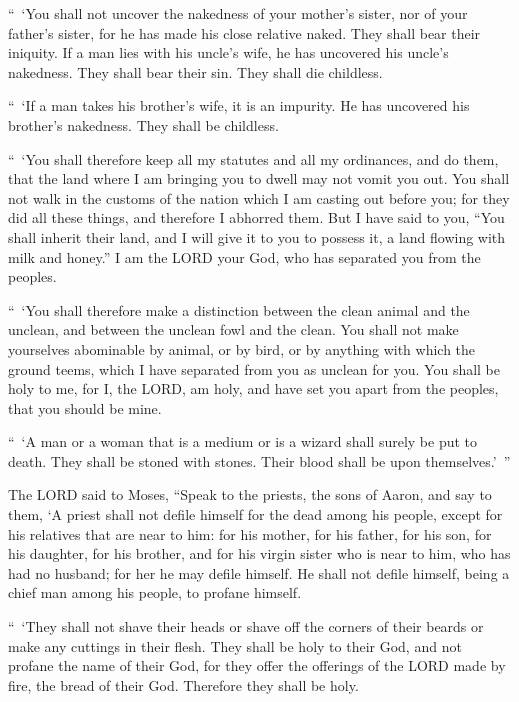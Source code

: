 \myverse{}“ ‘You shall not uncover the nakedness of your mother’s sister,
nor of your father’s sister, for he has made his close relative naked. They shall bear their iniquity.
\myverse{}If a man lies with his uncle’s wife, he has uncovered his uncle’s nakedness.
They shall bear their sin. They shall die childless.


\myverse{}“ ‘If a man takes his brother’s wife, it is an impurity. He has
uncovered his brother’s nakedness. They shall be childless.


\myverse{}“ ‘You shall therefore keep all my statutes and all my ordinances,
and do them, that the land where I am bringing you to dwell may not vomit you out.
\myverse{}You shall not walk in the customs of the nation which I am casting out before
you; for they did all these things, and therefore I abhorred them.
\myverse{}But I have said to you, “You shall inherit their land, and I will give it
to you to possess it, a land flowing with milk and honey.” I am the LORD your God, who has separated you
from the peoples.


\myverse{}“ ‘You shall therefore make a distinction between the clean animal
and the unclean, and between the unclean fowl and the clean. You shall not make yourselves abominable
by animal, or by bird, or by anything with which the ground teems, which I have separated from you as
unclean for you.
\myverse{}You shall be holy to me, for I, the LORD, am holy, and have set you apart
from the peoples, that you should be mine.


\myverse{}“ ‘A man or a woman that is a medium or is a wizard shall surely
be put to death. They shall be stoned with stones. Their blood shall be upon themselves.’ ”


\mychapter{} \myverse*{}The LORD said to Moses, “Speak to the priests, the sons of Aaron,
and say to them, ‘A priest shall not defile himself for the dead among his people,
\myverse{}except for his relatives that are near to him: for his mother, for his father,
for his son, for his daughter, for his brother,
\myverse{}and for his virgin sister who is near to him, who has had no husband; for her
he may defile himself.
\myverse{}He shall not defile himself, being a chief man among his people, to profane
himself.


\myverse{}“ ‘They shall not shave their heads or shave off the corners of
their beards or make any cuttings in their flesh.
\myverse{}They shall be holy to their God, and not profane the name of their God, for
they offer the offerings of the LORD made by fire, the bread of their God. Therefore they shall be holy.


